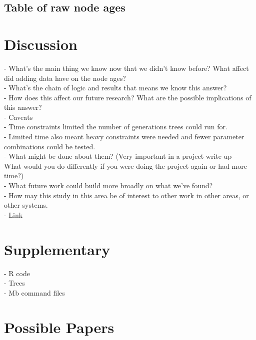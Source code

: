 \documentclass[a4paper,11pt]{article}
\begin{document}
\subsection{Table of raw node ages}

\section{Discussion}

- What’s the main thing we know now that we didn’t know before? What affect did adding data have on the node ages?\\

- What’s the chain of logic and results that means we know this answer?\\

- How does this affect our future research? What are the possible implications of this answer?\\

- Caveats\\
- Time constraints limited the number of generations trees could run for.\\
- Limited time also meant heavy constraints were needed and fewer parameter combinations could be tested.\\
- What might be done about them? (Very important in a project write-up -- What would you do differently if you were doing the project again or had more time?)\\

- What future work could build more broadly on what we’ve found?\\
- How may this study in this area be of interest to other work in other areas, or other systems.\\

- Link\\

\section{Supplementary}

- R code\\
- Trees\\{}
- Mb command files\\ 

\section{Possible Papers}

\citep{halliday2016eutherian}
\citep{halliday2016impact}
\citep{halliday2017resolving}
\citep{halliday2016eutherians}
\citep{beck2014ancient}
\citep{arcila2015evaluation}
\citep{near2004assessing}
\citep{lee2015morphological}
\citep{puttick2016dating}
\citep{pyron2016novel}
\citep{turner2017empirical}
\citep{heath2014fossilized}
\citep{wiens2004role}
\citep{nabhan2011impact}



\end{document}
